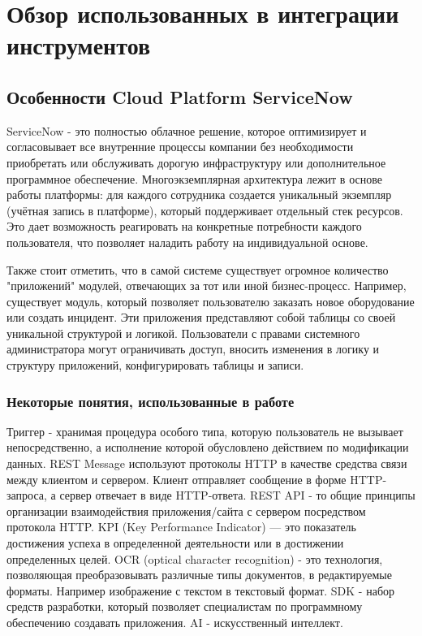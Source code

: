 \documentclass[14pt]{mmcs_article}
\begin{document}
\newpage
\section{Обзор использованных в интеграции инструментов}\label{dsfs}
\subsection{Особенности Cloud Platform ServiceNow}
ServiceNow - это полностью облачное решение, которое оптимизирует и согласовывает все внутренние процессы компании без необходимости приобретать или обслуживать дорогую инфраструктуру или дополнительное программное обеспечение. Многоэкземплярная архитектура лежит в основе работы платформы: для каждого сотрудника создается уникальный экземпляр (учётная запись в платформе), который поддерживает отдельный стек ресурсов. Это дает возможность реагировать на конкретные потребности каждого пользователя, что позволяет наладить работу на индивидуальной основе. 

Также стоит отметить, что в самой системе существует огромное количество "приложений" \- модулей, отвечающих за тот или иной бизнес-процесс. Например, существует модуль, который позволяет пользователю заказать новое оборудование или создать инцидент. Эти приложения представляют собой таблицы со своей уникальной структурой и логикой. Пользователи с правами системного администратора могут ограничивать доступ, вносить изменения в логику и структуру приложений, конфигурировать таблицы и записи.
\subsubsection{Некоторые понятия, использованные в работе}
Триггер -  хранимая процедура особого типа, которую пользователь не вызывает непосредственно, а исполнение которой обусловлено действием по модификации данных.
REST Message используют протоколы HTTP в качестве средства связи между клиентом и сервером. Клиент отправляет сообщение в форме HTTP-запроса, а сервер отвечает в виде HTTP-ответа.
REST API - то общие принципы организации взаимодействия приложения/сайта с сервером посредством протокола HTTP. 
KPI (Key Performance Indicator) — это показатель достижения успеха в определенной деятельности или в достижении определенных целей.
OCR (optical character recognition) - это технология, позволяющая преобразовывать различные типы документов,  в редактируемые форматы. Например изображение с текстом в текстовый формат.
SDK - набор средств разработки, который позволяет специалистам по программному обеспечению создавать приложения.
AI - искусственный интеллект.
\end{document}
